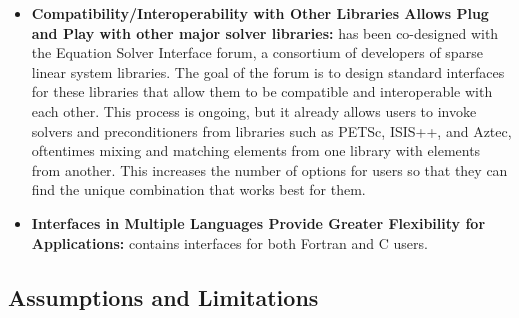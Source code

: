 \begin{itemize}
\item
{\bf Compatibility/Interoperability with Other Libraries Allows Plug and Play
with
other major solver libraries:} \hypre{} has been co-designed with the Equation
Solver Interface forum, a 
consortium of developers of sparse linear system libraries. The goal of the
forum is to design standard 
interfaces for these libraries that allow them to be compatible and
interoperable with each other. This 
process is ongoing, but it already allows \hypre{} users to invoke solvers and
preconditioners from libraries 
such as PETSc, ISIS++, and Aztec, oftentimes mixing and matching elements from
one library with 
elements from another. This increases the number of options for users so
that they can find the unique 
combination that works best for them.

\item
{\bf Interfaces in Multiple Languages Provide Greater Flexibility for Applications:}
\hypre{} contains 
interfaces for both Fortran and C users.

\end{itemize}

\subsection{Assumptions and Limitations}

